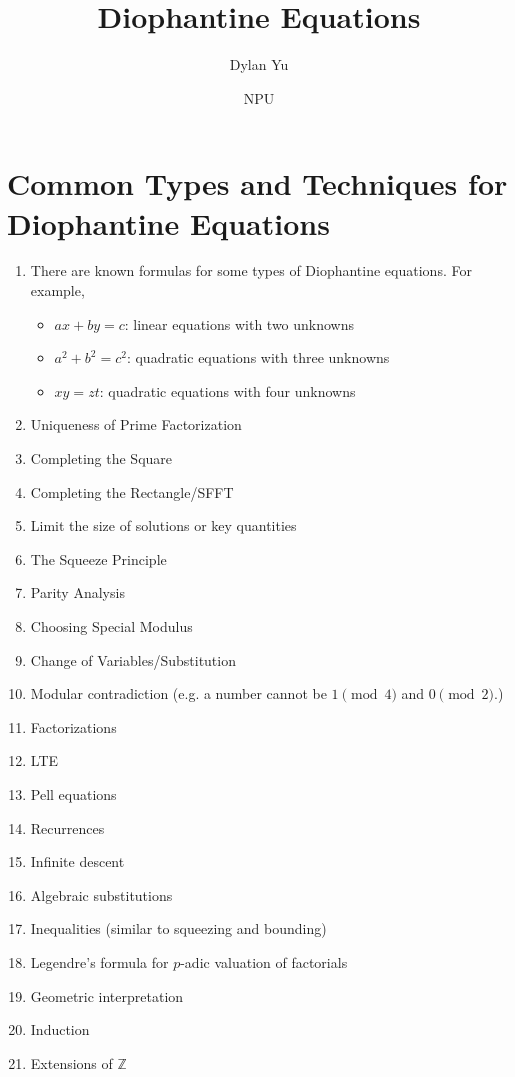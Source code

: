\documentclass[mast]{lucky}
\title{Diophantine Equations}
\author{Dylan Yu}
\date{NPU}
\begin{document}
\maketitle

\section{Common Types and Techniques for Diophantine Equations}
\begin{enumerate}
    \item There are known formulas for some types of Diophantine equations. For example,
    \begin{itemize}
        \item $ax+by=c$: linear equations with two unknowns
        \item $a^2+b^2=c^2$: quadratic equations with three unknowns
        \item $xy=zt$: quadratic equations with four unknowns
    \end{itemize}
    \item Uniqueness of Prime Factorization
    \item Completing the Square
    \item Completing the Rectangle/SFFT
    \item Limit the size of solutions or key quantities
    \item The Squeeze Principle
    \item Parity Analysis
    \item Choosing Special Modulus
    \item Change of Variables/Substitution
    \item Modular contradiction (e.g. a number cannot be $1\pmod{4}$ and $0\pmod{2}$.)
    \item Factorizations
    \item LTE
    \item Pell equations
    \item Recurrences
    \item Infinite descent
    \item Algebraic substitutions
    \item Inequalities (similar to squeezing and bounding)
    \item Legendre's formula for $p$-adic valuation of factorials
    \item Geometric interpretation
    \item Induction
    \item Extensions of $\mathbb{Z}$
\end{enumerate}
\end{document}
